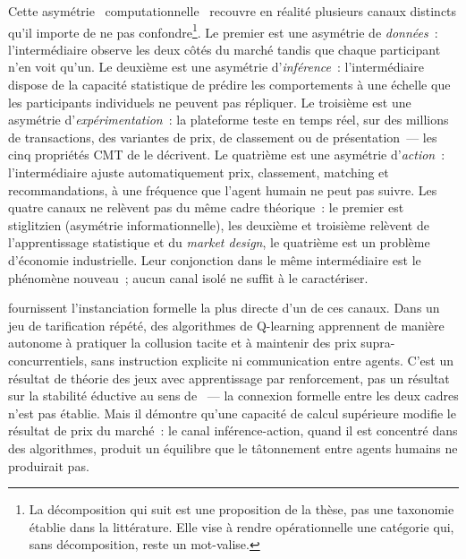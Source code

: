 Cette asymétrie \og~computationnelle~\fg{} recouvre en réalité plusieurs canaux distincts qu'il importe de ne pas confondre\footnote{La décomposition qui suit est une proposition de la thèse, pas une taxonomie établie dans la littérature. Elle vise à rendre opérationnelle une catégorie qui, sans décomposition, reste un mot-valise.}. Le premier est une asymétrie de \emph{données}~: l'intermédiaire observe les deux côtés du marché tandis que chaque participant n'en voit qu'un. Le deuxième est une asymétrie d'\emph{inférence}~: l'intermédiaire dispose de la capacité statistique de prédire les comportements à une échelle que les participants individuels ne peuvent pas répliquer. Le troisième est une asymétrie d'\emph{expérimentation}~: la plateforme teste en temps réel, sur des millions de transactions, des variantes de prix, de classement ou de présentation~--- les cinq propriétés CMT de \textcite{varian_computer_2010} le décrivent. Le quatrième est une asymétrie d'\emph{action}~: l'intermédiaire ajuste automatiquement prix, classement, matching et recommandations, à une fréquence que l'agent humain ne peut pas suivre. Les quatre canaux ne relèvent pas du même cadre théorique~: le premier est stiglitzien (asymétrie informationnelle), les deuxième et troisième relèvent de l'apprentissage statistique et du \emph{market design}, le quatrième est un problème d'économie industrielle. Leur conjonction dans le même intermédiaire est le phénomène nouveau~; aucun canal isolé ne suffit à le caractériser.

\textcite{calvano_artificial_2020} fournissent l'instanciation formelle la plus directe d'un de ces canaux. Dans un jeu de tarification répété, des algorithmes de Q-learning apprennent de manière autonome à pratiquer la collusion tacite et à maintenir des prix supra-concurrentiels, sans instruction explicite ni communication entre agents. C'est un résultat de théorie des jeux avec apprentissage par renforcement, pas un résultat sur la stabilité éductive au sens de \textcite{guesnerie_eductive_1992}~--- la connexion formelle entre les deux cadres n'est pas établie. Mais il démontre qu'une capacité de calcul supérieure modifie le résultat de prix du marché~: le canal inférence-action, quand il est concentré dans des algorithmes, produit un équilibre que le tâtonnement entre agents humains ne produirait pas.

